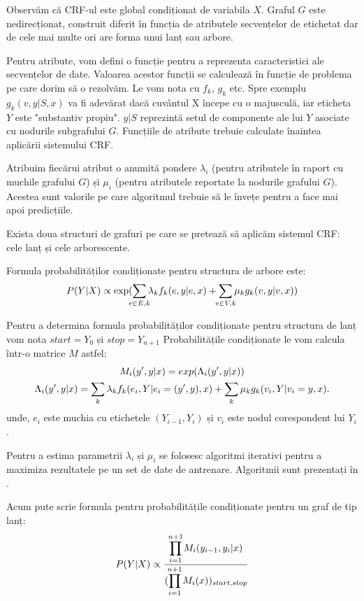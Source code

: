 Observăm că CRF-ul este global condiționat de variabila $X$. Graful $G$ este nedirecționat, construit
diferit în funcția de atributele secvențelor de etichetat dar de cele mai multe ori are forma unui
lanț sau arbore.

Pentru atribute, vom defini o funcție pentru a reprezenta caracteristici ale secvențelor de date. 
Valoarea acestor funcții se calculează în funcție de problema pe care dorim să o rezolvăm. Le vom nota 
cu $f_k$, $g_k$ etc. Spre exemplu $g_k(v, y|S, x)$ va fi adevărat dacă cuvântul X începe cu o majusculă, 
iar eticheta $Y$ este "substantiv propiu".\cite{crf} $y|S$ reprezintă  setul de componente ale lui $Y$ 
asociate cu nodurile subgrafului $G$. Funcțiile de atribute trebuie calculate înaintea aplicării 
sistemului CRF. 

Atribuim fiecărui atribut o anumită pondere $\lambda_i$ (pentru atributele în raport cu muchile grafului $G$)
și $\mu_i$ (pentru atributele reportate la nodurile grafului $G$). Acestea sunt valorile pe care algoritmul
trebuie să le învețe pentru a face mai apoi predicțiile.

Exista doua structuri de grafuri pe care se pretează să aplicăm sistemul CRF: cele lanț și cele
arborescente.

Formula probabilităților condiționate pentru structura de arbore este:
\begin{gather*}
  P(Y|X) \propto \exp(\smashoperator{\sum_{e \in E, k}} \lambda_k f_k(e, y|e, x) + \smashoperator{\sum_{v \in V, k}} \mu_k g_k(v, y|v, x))
\end{gather*}

Pentru a determina formula probabilităților condiționate pentru structura de lanț vom nota $start = Y_0$ și $stop = Y_{n+1}$
Probabilitățile condiționate le vom calcula într-o matrice $M$ astfel:
\begin{gather*}
  M_i(y', y|x) = exp(\Lambda_i(y', y|x)) \\
  \Lambda_i(y', y|x) = \smashoperator{\sum_k} \lambda_k f_k(e_i, Y|e_i = (y', y), x) +
                       \smashoperator{\sum_k} \mu_k g_k(v_i, Y|v_i = y, x).
\end{gather*}
unde, $e_i$ este muchia cu etichetele $(Y_{i-1}, Y_i)$ și $v_i$ este nodul corespondent lui $Y_i$. 

Pentru a estima parametrii $\lambda_i$ și $\mu_i$ se folosesc algoritmi iterativi pentru a maximiza
rezultatele pe un set de date de antrenare. Algoritmii sunt prezentați în \cite{crf}.

Acum pute scrie formula pentru probabilitățile condiționate pentru un graf de tip lanț:
\begin{gather*}
  P(Y|X) \propto \frac{\smashoperator{\prod_{i=1}^{n+1}} M_i(y_{i-1}, y_i | x)}{(\smashoperator{\prod_{i=1}^{n+1}} M_i(x))_{start,stop}}
\end{gather*}

